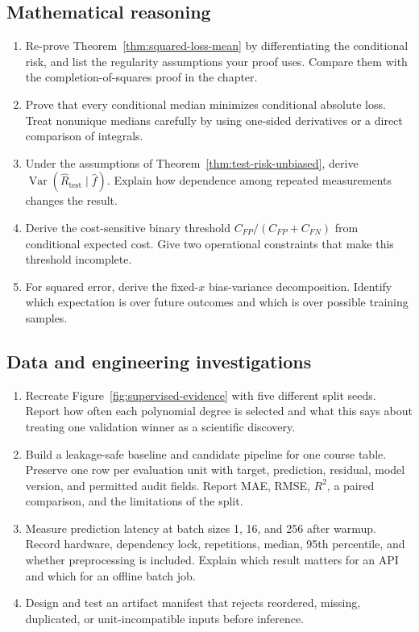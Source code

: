 \subsection*{Mathematical reasoning}

\begin{enumerate}[label=\textbf{SLC-M\arabic*.},leftmargin=*,itemsep=0.65em]
  \item Re-prove Theorem~\ref{thm:squared-loss-mean} by differentiating the
  conditional risk, and list the regularity assumptions your proof uses. Compare
  them with the completion-of-squares proof in the chapter.
  \item Prove that every conditional median minimizes conditional absolute
  loss. Treat nonunique medians carefully by using one-sided derivatives or a
  direct comparison of integrals.
  \item Under the assumptions of Theorem~\ref{thm:test-risk-unbiased}, derive
  $\operatorname{Var}(\widehat R_{\mathrm{test}}\mid\widehat f)$. Explain how
  dependence among repeated measurements changes the result.
  \item Derive the cost-sensitive binary threshold
  $C_{FP}/(C_{FP}+C_{FN})$ from conditional expected cost. Give two operational
  constraints that make this threshold incomplete.
  \item For squared error, derive the fixed-$x$ bias-variance decomposition.
  Identify which expectation is over future outcomes and which is over possible
  training samples.
\end{enumerate}

\subsection*{Data and engineering investigations}

\begin{enumerate}[label=\textbf{SLC-C\arabic*.},leftmargin=*,itemsep=0.65em]
  \item Recreate Figure~\ref{fig:supervised-evidence} with five different split
  seeds. Report how often each polynomial degree is selected and what this says
  about treating one validation winner as a scientific discovery.
  \item Build a leakage-safe baseline and candidate pipeline for one course
  table. Preserve one row per evaluation unit with target, prediction, residual,
  model version, and permitted audit fields. Report MAE, RMSE, $R^2$, a paired
  comparison, and the limitations of the split.
  \item Measure prediction latency at batch sizes 1, 16, and 256 after warmup.
  Record hardware, dependency lock, repetitions, median, 95th percentile, and
  whether preprocessing is included. Explain which result matters for an API
  and which for an offline batch job.
  \item Design and test an artifact manifest that rejects reordered, missing,
  duplicated, or unit-incompatible inputs before inference.
\end{enumerate}

